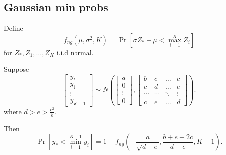 \documentclass[12pt]{article}
\begin{document}
\subsection{Gaussian min probs}

Define
\[
f_{ng}(\mu,\sigma^2, K) = \Pr[\sigma Z_* + \mu < \max_{i=1}^K Z_i]
\]
for $Z_*, Z_1,\hdots, Z_K$ i.i.d normal.

Suppose
\[
\begin{bmatrix}
y_* \\
y_1 \\
\vdots \\
y_{K-1}
\end{bmatrix}
\sim
N\left(
\begin{bmatrix}
a\\
0\\
\vdots \\
0
\end{bmatrix},
\begin{bmatrix}
b & c & \hdots & c\\
c & d & \hdots & e\\
\cdots & \cdots & \ddots & \vdots\\
c & e & \hdots & d
\end{bmatrix}
\right).
\]
where $d > e > \frac{c^2}{b}$.

Then
\[
\Pr[y_* < \min_{i=1}^{K-1} y_i] = 1- f_{ng}\left(-\frac{a}{\sqrt{d-e}}, \frac{b + e- 2c}{d-e},K-1\right).
\]
\end{document}
